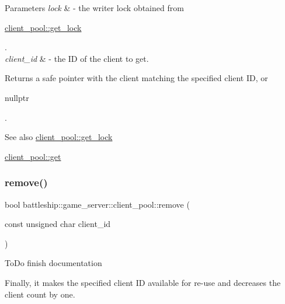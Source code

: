 \begin{DoxyParams}{Parameters}
{\em lock} & -\/ the writer lock obtained from
\begin{DoxyCode}
\hyperlink{classbattleship_1_1game__server_1_1client__pool_a6feaf8b0a5c743aa411c2c82be229689}{client\_pool::get\_lock} 
\end{DoxyCode}
 . \\
\hline
{\em client\+\_\+id} & -\/ the ID of the client to get.\\
\hline
\end{DoxyParams}
\begin{DoxyReturn}{Returns}
a safe pointer with the client matching the specified client ID, or 
\begin{DoxyCode}
\textcolor{keyword}{nullptr} 
\end{DoxyCode}
 .
\end{DoxyReturn}
\begin{DoxySeeAlso}{See also}
\hyperlink{classbattleship_1_1game__server_1_1client__pool_a6feaf8b0a5c743aa411c2c82be229689}{client\+\_\+pool\+::get\+\_\+lock} 

\hyperlink{classbattleship_1_1game__server_1_1client__pool_a39d1db920be949755ebe64b50d2bff96}{client\+\_\+pool\+::get} 
\end{DoxySeeAlso}
\mbox{\label{classbattleship_1_1game__server_1_1client__pool_ab16b4cb64048ba0974f5a792bfe1c15b}} 
\subsubsection{\texorpdfstring{remove()}{remove()}}
{\footnotesize\ttfamily bool battleship\+::game\+\_\+server\+::client\+\_\+pool\+::remove (\begin{DoxyParamCaption}\item[{const unsigned char}]{client\+\_\+id }\end{DoxyParamCaption})}

To\+Do finish documentation

Finally, it makes the specified client ID available for re-\/use and decreases the client count by one.


